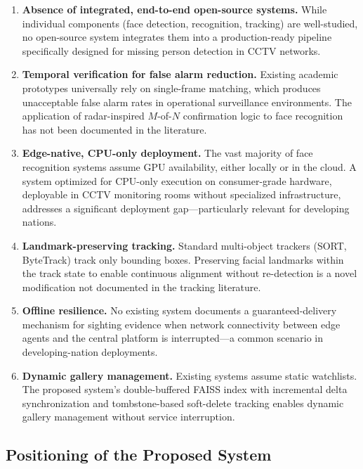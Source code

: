\documentclass[12pt, a4paper]{article}
\begin{document}
\begin{enumerate}[label=\textbf{Gap \arabic*:}, leftmargin=*]
    \item \textbf{Absence of integrated, end-to-end open-source systems.} While individual components (face detection, recognition, tracking) are well-studied, no open-source system integrates them into a production-ready pipeline specifically designed for missing person detection in CCTV networks.
    
    \item \textbf{Temporal verification for false alarm reduction.} Existing academic prototypes universally rely on single-frame matching, which produces unacceptable false alarm rates in operational surveillance environments. The application of radar-inspired $M$-of-$N$ confirmation logic to face recognition has not been documented in the literature.
    
    \item \textbf{Edge-native, CPU-only deployment.} The vast majority of face recognition systems assume GPU availability, either locally or in the cloud. A system optimized for CPU-only execution on consumer-grade hardware, deployable in CCTV monitoring rooms without specialized infrastructure, addresses a significant deployment gap---particularly relevant for developing nations.
    
    \item \textbf{Landmark-preserving tracking.} Standard multi-object trackers (SORT, ByteTrack) track only bounding boxes. Preserving facial landmarks within the track state to enable continuous alignment without re-detection is a novel modification not documented in the tracking literature.
    
    \item \textbf{Offline resilience.} No existing system documents a guaranteed-delivery mechanism for sighting evidence when network connectivity between edge agents and the central platform is interrupted---a common scenario in developing-nation deployments.
    
    \item \textbf{Dynamic gallery management.} Existing systems assume static watchlists. The proposed system's double-buffered FAISS index with incremental delta synchronization and tombstone-based soft-delete tracking enables dynamic gallery management without service interruption.
\end{enumerate}

\subsection{Positioning of the Proposed System}
\end{document}
